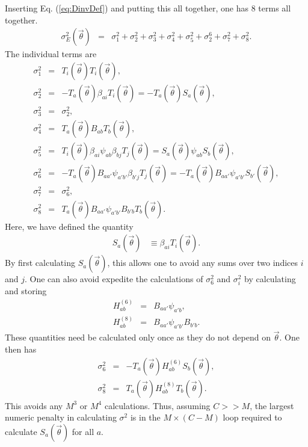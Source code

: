 \documentclass[UserManual.tex]{subfiles}
\begin{document}
Inserting Eq. (\ref{eq:DinvDef}) and putting this all together, one has 8 terms all together.
\begin{eqnarray}
\sigma_E^2(\vec{\theta})&=&
\sigma^2_1+\sigma_2^2+\sigma^2_3+\sigma^2_4+\sigma^2_5+\sigma_2^6+\sigma^2_7+\sigma^2_8.
\end{eqnarray}
The individual terms are
\begin{eqnarray}
\sigma_1^2&=&T_i(\vec{\theta})T_i(\vec{\theta}),\\
\nonumber
\sigma_2^2&=&-T_a(\vec{\theta})\beta_{ai}T_i(\vec{\theta})=-T_a(\vec{\theta})S_a(\vec{\theta}),\\
\nonumber
\sigma_3^2&=&\sigma_2^2,\\
\nonumber
\sigma_4^2&=&T_a(\vec{\theta})B_{ab}T_b(\vec{\theta}),\\
\nonumber
\sigma_5^2&=&T_i(\vec{\theta})\beta_{ai}\psi_{ab}\beta_{bj}T_j(\vec{\theta})=S_a(\vec{\theta})\psi_{ab}S_b(\vec{\theta}),\\
\nonumber
\sigma_6^2&=&-T_a(\vec{\theta})B_{aa'}\psi_{a'b'}\beta_{b'j}T_j(\vec{\theta})=-T_a(\vec{\theta})B_{aa'}\psi_{a'b'}S_{b'}(\vec{\theta}),\\
\nonumber
\sigma_7^2&=&\sigma_6^2,\\
\nonumber
\sigma_8^2&=&T_a(\vec{\theta})B_{aa'}\psi_{a'b'}B_{b'b}T_b(\vec{\theta}).
\end{eqnarray}
Here, we have defined the quantity 
\begin{eqnarray}
S_a(\vec{\theta})&\equiv \beta_{ai}T_i(\vec{\theta}).
\end{eqnarray}
By first calculating $S_a(\vec{\theta})$, this allows one to avoid any sums over two indices $i$ and $j$. One can also avoid expedite the calculations of $\sigma_6^2$ and $\sigma_i^2$ by calculating and storing
\begin{eqnarray}
H^{(6)}_{ab}&=&B_{aa'}\psi_{a'b},\\
H^{(8)}_{ab}&=&B_{aa'}\psi_{a'b'}B_{b'b}.
\end{eqnarray}
These quantities need be calculated only once as they do not depend on $\vec{\theta}$. One then has
\begin{eqnarray}
\sigma_6^2&=&-T_{a}(\vec{\theta})H^{(6)}_{ab}S_b(\vec{\theta}),\\
\sigma_8^2&=&T_a(\vec{\theta})H^{(8)}_{ab}T_b(\vec{\theta}).
\end{eqnarray}
This avoids any $M^3$ or $M^4$ calculations. Thus, assuming $C>>M$, the largest numeric penalty in calculating $\sigma^2$ is in the $M\times (C-M)$ loop required to calculate $S_a(\vec{\theta})$ for all $a$. 
\end{document}
